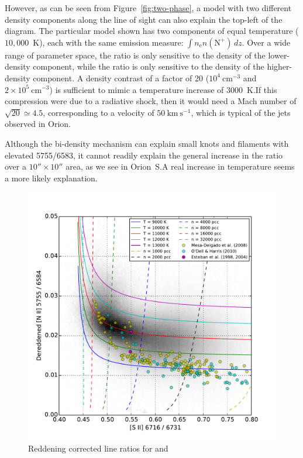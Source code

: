 \documentclass[preprint]{aastex}
\begin{document}
However, as can be seen from Figure~\ref{fig:two-phase}, a model with
two different density components along the line of sight can also
explain the top-left of the diagram.  The particular model shown has
two components of equal temperature (\(10,000\)~K), each with the same
emission measure: \(\int n_{\mathrm{e}} n(\mathrm{N^+}) \, dz\).  Over
a wide range of parameter space, the \sii{} ratio is only sensitive to
the density of the lower-density component, while the \nii{} ratio is
only sensitive to the density of the higher-density component.  A
density contrast of a factor of 20 (\(10^4~\mathrm{cm^{-3}}\) and
\(2 \times 10^5~\mathrm{cm^{-3}}\)) is sufficient to mimic a temperature
increase of \(3000\)~K.\@   If this compression were due to a
radiative shock, then it would need a Mach number of \(\sqrt{20}
\simeq 4.5\), corresponding to a velocity of \(50~\mathrm{km\
  s^{-1}}\), which is typical of the jets observed in Orion. 

Although the bi-density mechanism can explain small knots and
filaments with elevated 5755/6583, it cannot readily explain the
general increase in the ratio over a \(10'' \times 10''\) area, as we
see in Orion~S.\@  A real increase in temperature seems a more likely
explanation.  

\begin{figure}
  \centering
  \includegraphics{nii-deredden-vs-sii-ratios}
  \caption{Reddening corrected line ratios for \sii{} and \nii{}}
  \label{fig:deredden}
\end{figure}
\end{document}
